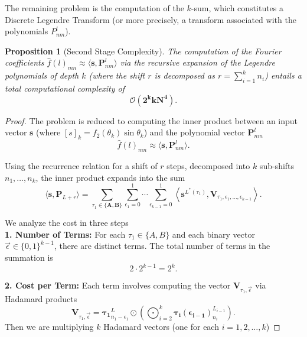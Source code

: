 \documentclass[11pt]{article}
\newtheorem{prop}[thm]{Proposition}
\theoremstyle{definition}
\theoremstyle{remark}
\numberwithin{equation}{section}
\begin{document}
The remaining problem is the computation of the $k$-sum, which constitutes a Discrete Legendre Transform (or more precisely, a transform associated with the polynomials $P^l_{nm}$).

\begin{prop}[Second Stage Complexity]\label{P_2}
The computation of the Fourier coefficients $\hat{f}(l)_{mn}\approx  \langle \mathbf{s}, \mathbf{P}^l_{nm} \rangle$ via the recursive expansion of the Legendre polynomials of depth $k$ (where the shift $r$ is decomposed as $r = \sum_{i=1}^k n_i$) entails a total computational complexity of
\begin{equation*}
    \boldsymbol{\mathcal{O}(2^k k N^4)}.
\end{equation*}
\end{prop}

\begin{proof}
The problem is reduced to computing the inner product between an input vector $\mathbf{s}$ (where $[s]_k = f_2(\theta_k) \sin \theta_k$) and the polynomial vector $\mathbf{P}^l_{nm}$
\begin{equation*} 
    \hat{f}(l)_{mn} \approx \langle \mathbf{s}, \mathbf{P}^l_{nm} \rangle.
\end{equation*}

Using the recurrence relation for a shift of $r$ steps, decomposed into $k$ sub-shifts $n_1, \dots, n_k$, the inner product expands into the sum
\begin{equation*}
    \langle \mathbf{s}, \mathbf{P}_{L+r} \rangle = \sum_{\tau_1 \in \{\mathbf{A},\mathbf{B}\}} \sum_{\epsilon_1=0}^{1} \cdots \sum_{\epsilon_{k-1}=0}^{1} \left\langle \mathbf{s}^{L^*(\tau_1)}, \mathbf{V}_{\tau_1, \epsilon_1, \ldots, \epsilon_{k-1}} \right\rangle.
\end{equation*}

We analyze the cost in three steps\\%

\textbf{1. Number of Terms:}
For each $\tau_1 \in \{A, B\}$ and each binary vector $\vec{\epsilon} \in \{0,1\}^{k-1}$, there are distinct terms. The total number of terms in the summation is
\begin{equation*}
    2 \cdot 2^{k-1} = 2^k.
\end{equation*}

\textbf{2. Cost per Term:}
Each term involves computing the vector $\mathbf{V}_{\tau_1, \vec{\epsilon}}$ via Hadamard products
\begin{equation*}
    \mathbf{V}_{\tau_1, \vec{\epsilon}} =  \mathbf{\tau_1}_{n_1 - \epsilon_1}^{L} \odot \left( \bigodot_{i=2}^{k} \mathbf{\tau_i(\epsilon_{i-1})}_{n_i}^{L_{i-1}} \right) .
\end{equation*}
Then we are multiplying $k$ Hadamard vectors (one for each $i = 1, 2, \dots, k$)


\end{proof}
\end{document}

